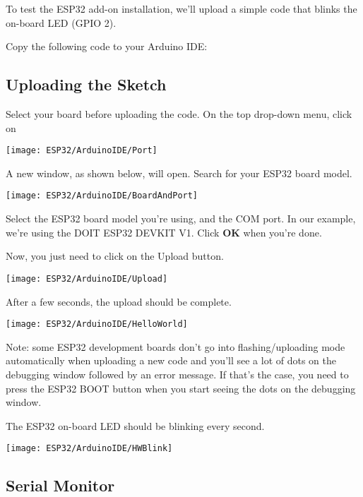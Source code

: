 To test the ESP32 add-on installation, we’ll upload a simple code that blinks the on-board LED (GPIO 2).

\medskip

Copy the following code to your Arduino IDE:

{
    \label{ESP32:BuiltinLEDTest}
}


\subsection{Uploading the Sketch}

Select your board before uploading the code. On the top drop-down menu, click on 

        \texttt{[image: ESP32/ArduinoIDE/Port]}
        
A new window, as shown below, will open. Search for your ESP32 board model.

        \texttt{[image: ESP32/ArduinoIDE/BoardAndPort]}
        
Select the ESP32 board model you're using, and the COM port. In our example, we're using the DOIT ESP32 DEVKIT V1. Click \textbf{OK} when you're done.

\bigskip

Now, you just need to click on the Upload button.        
        

        \texttt{[image: ESP32/ArduinoIDE/Upload]}
        
After a few seconds, the upload should be complete.        

        \texttt{[image: ESP32/ArduinoIDE/HelloWorld]}
        
Note: some ESP32 development boards don’t go into flashing/uploading mode automatically when uploading a new code and you’ll see a lot of dots on the debugging window followed by an error message. If that’s the case, you need to press the ESP32 BOOT button when you start seeing the dots on the debugging window.

\bigskip

The ESP32 on-board LED should be blinking every second.        

        \texttt{[image: ESP32/ArduinoIDE/HWBlink]}
        
\subsection{Serial Monitor}

